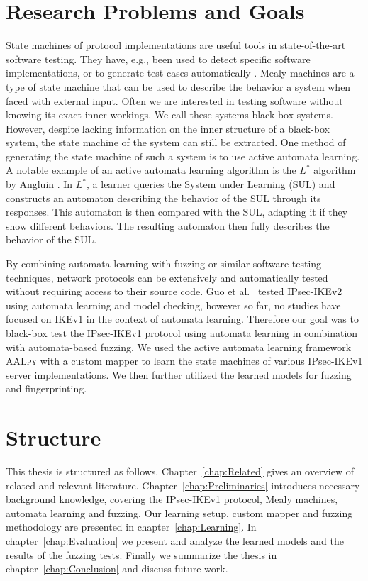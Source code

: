 \section{Research Problems and Goals}
State machines of protocol implementations are useful tools in state-of-the-art software testing. They have, e.g., been used to detect specific software implementations, or to generate test cases automatically \parencites{pferscher2021fingerprinting, pferscher2022fuzzing}. Mealy machines are a type of state machine that can be used to describe the behavior a system when faced with external input. Often we are interested in testing software without knowing its exact inner workings. We call these systems black-box systems. However, despite lacking information on the inner structure of a black-box system, the state machine of the system can still be extracted. One method of generating the state machine of such a system is to use active automata learning. A notable example of an active automata learning algorithm is the $L^*$ algorithm by Angluin \parencite{angluin1987learning}. In $L^*$, a learner queries the System under Learning (SUL) and constructs an automaton describing the behavior of the SUL through its responses. This automaton is then compared with the SUL, adapting it if they show different behaviors. The resulting automaton then fully describes the behavior of the SUL.

By combining automata learning with fuzzing or similar software testing techniques, network protocols can be extensively and automatically tested without requiring access to their source code. Guo et al.~\textcite{guo2019model} tested IPsec-IKEv2 using automata learning and model checking, however so far, no studies have focused on IKEv1 in the context of automata learning. Therefore our goal was to black-box test the IPsec-IKEv1 protocol using automata learning in combination with automata-based fuzzing. We used the active automata learning framework \textsc{AALpy} \textcite{muvskardin2022aalpy} with a custom mapper to learn the state machines of various IPsec-IKEv1 server implementations. We then further utilized the learned models for fuzzing and fingerprinting. %

\section{Structure}
This thesis is structured as follows. Chapter~\ref{chap:Related} gives an overview of related and relevant literature. Chapter~\ref{chap:Preliminaries} introduces necessary background knowledge, covering the IPsec-IKEv1 protocol, Mealy machines, automata learning and fuzzing. Our learning setup, custom mapper and fuzzing methodology are presented in chapter~\ref{chap:Learning}. In chapter~\ref{chap:Evaluation} we present and analyze the learned models and the results of the fuzzing tests.
Finally we summarize the thesis in chapter~\ref{chap:Conclusion} and discuss future work.